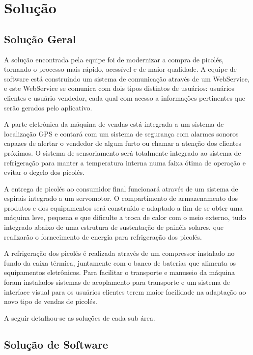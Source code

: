 \chapter{Solução}

\section{Solução Geral}

A solução encontrada pela equipe foi de modernizar a compra de picolés, tornando o processo mais rápido, acessível e de maior qualidade. A equipe de software está construindo um sistema de comunicação através de um WebService, e este WebService se comunica com dois tipos distintos de usuários: usuários clientes e usuário vendedor, cada qual com acesso a informações pertinentes que serão gerados pelo aplicativo.

A parte eletrônica da máquina de vendas está integrada a um sistema de localização GPS e contará com um sistema de segurança com alarmes sonoros capazes de alertar o vendedor de algum furto ou chamar a atenção dos clientes próximos. O sistema de sensoriamento será totalmente integrado ao sistema de refrigeração para manter a temperatura interna numa faixa ótima de operação e evitar o degelo dos picolés. 

A entrega de picolés ao consumidor final funcionará através de um sistema de espirais integrado a um servomotor. O compartimento de armazenamento dos produtos e dos equipamentos será construído e adaptado a fim de se obter uma máquina leve, pequena e que dificulte a troca de calor com o meio externo, tudo integrado abaixo de uma estrutura de sustentação de painéis solares, que realizarão o fornecimento de energia para refrigeração dos picolés.

A refrigeração dos picolés é realizada através de um compressor instalado no fundo da caixa térmica,  juntamente com o banco de baterias que alimenta os equipamentos eletrônicos. Para facilitar o transporte e manuseio da máquina foram instalados sistemas de acoplamento para transporte e um sistema de interface visual para os usuários clientes terem maior facilidade na adaptação ao novo tipo de vendas de picolés.

A seguir detalhou-se as soluções de cada sub área.

\section{Solução de Software}

